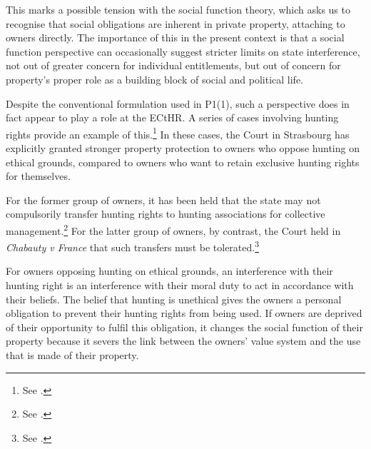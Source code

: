 This marks a possible tension with the social function theory, which asks us to recognise that social obligations are inherent in private property, attaching to owners directly. The importance of this in the present context is that a social function perspective can occasionally suggest stricter limits on state interference, not out of greater concern for individual entitlements, but out of concern for property's proper role as a building block of social and political life.

Despite the conventional formulation used in P1(1), such a perspective does in fact appear to play a role at the ECtHR. A series of cases involving hunting rights provide an example of this.\footnote{See \cite{chassagnou99,hermann12,chabauty12}.} In these cases, the Court in Strasbourg has explicitly granted stronger property protection to owners who oppose hunting on ethical grounds, compared to owners who want to retain exclusive hunting rights for themselves.

For the former group of owners, it has been held that the state may not compulsorily transfer hunting rights to hunting associations for collective management.\footnote{See \cite{chassagnou99, hermann12}.} For the latter group of owners, by contrast, the Court held in {\it Chabauty v France} that such transfers must be tolerated.\footnote{See \cite{chabauty12}.}

For owners opposing hunting on ethical grounds, an interference with their hunting right is an interference with their moral duty to act in accordance with their beliefs. The belief that hunting is unethical gives the owners a personal obligation to prevent their hunting rights from being used. If owners are deprived of their opportunity to fulfil this obligation, it changes the social function of their property because it severs the link between the owners' value system and the use that is made of their property.

